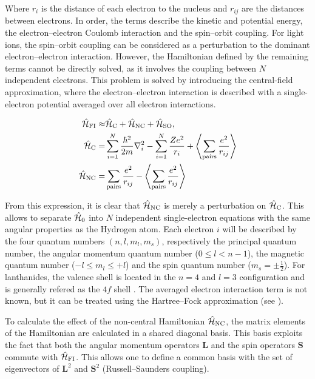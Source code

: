Where $r_i$ is the distance of each electron to the nucleus and $r_{ij}$ are the distances between electrons. In order, the terms describe the kinetic and potential energy, the electron--electron Coulomb interaction and the spin--orbit coupling. For light ions, the spin--orbit coupling can be considered as a perturbation to the dominant electron--electron interaction. However, the Hamiltonian defined by the remaining terms cannot be directly solved, as it involves the coupling between $N$ independent electrons. This problem is solved by introducing the central-field approximation, where the electron--electron interaction is described with a single-electron potential averaged over all electron interactions. 

\begin{align}
\begin{split}
    \hat{\mathcal{H}}_{\text{FI}} \approx& \hat{\mathcal{H}}_{\text{C}} + \hat{\mathcal{H}}_{\text{NC}} + \hat{\mathcal{H}}_{\text{SO}}, \\
    \hat{\mathcal{H}}_{\text{C}} =& \sum_{i=1}^N \frac{\hbar^2}{2m} \nabla_i^2  - \sum_{i=1}^N \frac{Ze^2}{r_i} + \left\langle\sum_{\text{pairs}} \frac{e^2}{r_{ij}}\right\rangle\\
    \hat{\mathcal{H}}_{\text{NC}} =& \sum_{\text{pairs}} \frac{e^2}{r_{ij}} - \left\langle\sum_{\text{pairs}} \frac{e^2}{r_{ij}}\right\rangle
\end{split}
\end{align}

From this expression, it is clear that $\hat{\mathcal{H}}_{\text{NC}}$ is merely a perturbation on $\hat{\mathcal{H}}_{\text{C}}$. This allows to separate $\hat{\mathcal{H}}_{\text{0}}$ into $N$ independent single-electron equations with the same angular properties as the Hydrogen atom. Each electron $i$ will be described by the four quantum numbers $(n, l, m_l, m_s)$, respectively the principal quantum number, the angular momentum quantum number ($0\leq l<n-1$), the magnetic quantum number ($-l\leq m_l\leq +l$) and the spin quantum number ($m_s=\pm\tfrac{1}{2}$). For lanthanides, the valence shell is located in the $n=4$ and $l=3$ configuration and is generally refered as the $4f$ shell . The averaged electron interaction term is not known, but it can be treated using the Hartree--Fock approximation (see ).

To calculate the effect of the non-central Hamiltonian $\hat{\mathcal{H}}_{\text{NC}}$, the matrix elements of the Hamiltonian are calculated in a shared diagonal basis. This basis exploits the fact that both the angular momentum operators $\mathbf{L}$ and the spin operators $\mathbf{S}$ commute with $\hat{\mathcal{H}}_{\text{FI}}$. This allows one to define a common basis with the set of eigenvectors of $\mathbf{L}^2$ and $\mathbf{S}^2$ (Russell--Saunders coupling).

